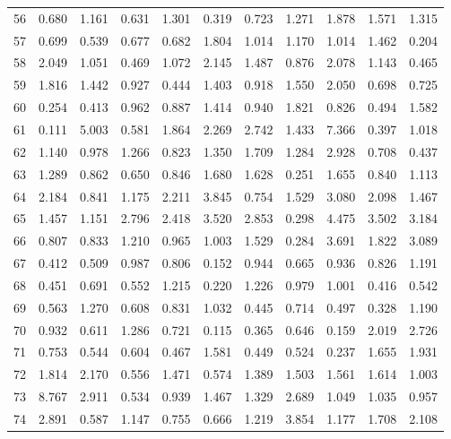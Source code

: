 \begin{tabular}{lrrrrrrrrrr}
56  &  0.680 &  1.161 &  0.631 &  1.301 &  0.319 &  0.723 &  1.271 &  1.878 &  1.571 &  1.315 \\
57  &  0.699 &  0.539 &  0.677 &  0.682 &  1.804 &  1.014 &  1.170 &  1.014 &  1.462 &  0.204 \\
58  &  2.049 &  1.051 &  0.469 &  1.072 &  2.145 &  1.487 &  0.876 &  2.078 &  1.143 &  0.465 \\
59  &  1.816 &  1.442 &  0.927 &  0.444 &  1.403 &  0.918 &  1.550 &  2.050 &  0.698 &  0.725 \\
60  &  0.254 &  0.413 &  0.962 &  0.887 &  1.414 &  0.940 &  1.821 &  0.826 &  0.494 &  1.582 \\
61  &  0.111 &  5.003 &  0.581 &  1.864 &  2.269 &  2.742 &  1.433 &  7.366 &  0.397 &  1.018 \\
62  &  1.140 &  0.978 &  1.266 &  0.823 &  1.350 &  1.709 &  1.284 &  2.928 &  0.708 &  0.437 \\
63  &  1.289 &  0.862 &  0.650 &  0.846 &  1.680 &  1.628 &  0.251 &  1.655 &  0.840 &  1.113 \\
64  &  2.184 &  0.841 &  1.175 &  2.211 &  3.845 &  0.754 &  1.529 &  3.080 &  2.098 &  1.467 \\
65  &  1.457 &  1.151 &  2.796 &  2.418 &  3.520 &  2.853 &  0.298 &  4.475 &  3.502 &  3.184 \\
66  &  0.807 &  0.833 &  1.210 &  0.965 &  1.003 &  1.529 &  0.284 &  3.691 &  1.822 &  3.089 \\
67  &  0.412 &  0.509 &  0.987 &  0.806 &  0.152 &  0.944 &  0.665 &  0.936 &  0.826 &  1.191 \\
68  &  0.451 &  0.691 &  0.552 &  1.215 &  0.220 &  1.226 &  0.979 &  1.001 &  0.416 &  0.542 \\
69  &  0.563 &  1.270 &  0.608 &  0.831 &  1.032 &  0.445 &  0.714 &  0.497 &  0.328 &  1.190 \\
70  &  0.932 &  0.611 &  1.286 &  0.721 &  0.115 &  0.365 &  0.646 &  0.159 &  2.019 &  2.726 \\
71  &  0.753 &  0.544 &  0.604 &  0.467 &  1.581 &  0.449 &  0.524 &  0.237 &  1.655 &  1.931 \\
72  &  1.814 &  2.170 &  0.556 &  1.471 &  0.574 &  1.389 &  1.503 &  1.561 &  1.614 &  1.003 \\
73  &  8.767 &  2.911 &  0.534 &  0.939 &  1.467 &  1.329 &  2.689 &  1.049 &  1.035 &  0.957 \\
74  &  2.891 &  0.587 &  1.147 &  0.755 &  0.666 &  1.219 &  3.854 &  1.177 &  1.708 &  2.108 \\

\end{tabular}
